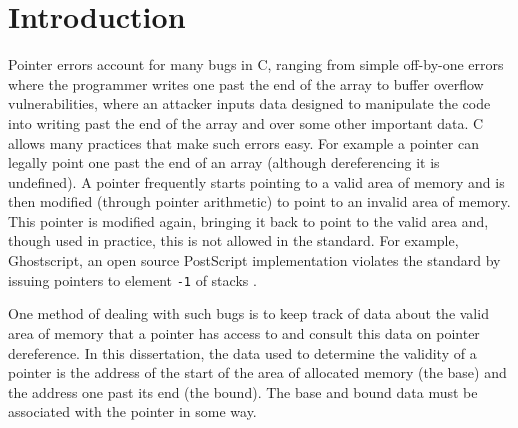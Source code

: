\documentclass[a4paper,12pt,twoside,openright]{report}
\begin{document}
\onehalfspacing


\chapter{Introduction}
\setcounter{page}{1} 

Pointer errors account for many bugs in C, ranging from simple off-by-one errors where the programmer writes one past the end of the array to buffer overflow vulnerabilities, where an attacker inputs data designed to manipulate the code into writing past the end of the array and over some other important data.
C allows many practices that make such errors easy. 
For example a pointer can legally point one past the end of an array (although dereferencing it is undefined).
A pointer frequently starts pointing to a valid area of memory and is then modified (through pointer arithmetic) to point to an invalid area of memory.
This pointer is modified again, bringing it back to point to the valid area and, though used in practice, this is not allowed in the standard.
For example, Ghostscript, an open source PostScript implementation violates the standard by issuing pointers to element \verb!-1! of stacks \cite{ghostscript}.

One method of dealing with such bugs is to keep track of data about the valid area of memory that a pointer has access to and consult this data on pointer dereference.
In this dissertation, the data used to determine the validity of a pointer is the address of the start of the area of allocated memory (the base) and the address one past its end (the bound).
The base and bound data must be associated with the pointer in some way.
\end{document}
